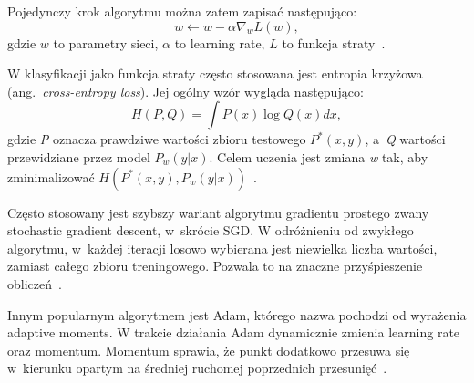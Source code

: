 Pojedynczy krok algorytmu można zatem zapisać następująco:
\[w \leftarrow w - \alpha \nabla_{w} L(w),\]
gdzie \(w\) to parametry sieci, \(\alpha\) to learning rate, \(L\) to funkcja straty~\cite{Russell2020}.

W klasyfikacji jako funkcja straty często stosowana jest entropia krzyżowa (ang.~\textit{cross-entropy loss}).
Jej ogólny wzór wygląda następująco:
\[H(P,Q) = \int P(x) \log Q(x)dx,\]
gdzie \textit{P} oznacza prawdziwe wartości zbioru testowego \textit{\(P^*(x, y)\)}, a~\textit{Q} wartości przewidziane przez model \textit{\(P_w(y | x)\)}.
Celem uczenia jest zmiana \textit{w} tak, aby zminimalizować \(H(P^*(x, y),P_w(y | x))\)~\cite{Russell2020}.

Często stosowany jest szybszy wariant algorytmu gradientu prostego zwany stochastic gradient descent, w~skrócie SGD\@.
W odróżnieniu od zwykłego algorytmu, w~każdej iteracji losowo wybierana jest niewielka liczba wartości, zamiast całego zbioru treningowego.
Pozwala to na znaczne przyśpieszenie obliczeń~\cite{Russell2020}.

Innym popularnym algorytmem jest Adam, którego nazwa pochodzi od wyrażenia adaptive moments.
W trakcie działania Adam dynamicznie zmienia learning rate oraz momentum.
Momentum sprawia, że punkt dodatkowo przesuwa się w~kierunku opartym na średniej ruchomej poprzednich przesunięć~\cite{Goodfellow2016}.
